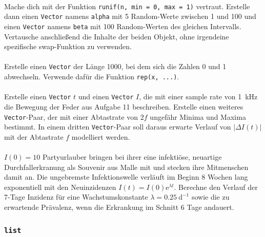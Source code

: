 \documentclass[paper=A4, pagesize, DIV=calc, smallheadings,
fontsize=12pt, expansion=false]{scrreprt}
\begin{document}
\paragraph{}
Mache dich mit der Funktion \texttt{runif(n, min = 0, max = 1)} vertraut. Erstelle dann einen \texttt{Vector} 
namens \texttt{alpha} mit 5 
Random-Werte zwischen 1 und 100 und einen \texttt{Vector} namens \texttt{beta} mit 100 Random-Werten des gleichen 
Intervalls.
Vertausche anschließend die Inhalte der beiden Objekt, ohne irgendeine spezifische swap-Funktion zu verwenden.


\paragraph{}
Erstelle einen \texttt{Vector} der Länge 1000, bei dem sich die Zahlen 0 und 1 abwechseln. Verwende dafür die Funktion 
\texttt{rep(x, ...)}.

\paragraph{}
Erstelle einen \texttt{Vector} $t$ und einen \texttt{Vector} $I$, die mit einer sample rate von \SI{1}{kHz} die 
Bewegung der Feder aus Aufgabe 11 %
beschreiben.
Erstelle einen weiteres \texttt{Vector}-Paar, der mit einer Abtastrate von $2f$ ungefähr Minima und Maxima bestimmt.
In einem dritten \texttt{Vector}-Paar soll daraus erwarte Verlauf von $|\Delta I(t)|$ mit der Abtastrate $f$ modelliert 
werden.

\paragraph{}
$I(0) = 10$ Partyurlauber bringen bei ihrer eine infektiöse, neuartige Durchfallerkranung als Souvenir aus Malle mit 
und stecken ihre Mitmenschen damit an.
Die ungebremste Infektionswelle verläuft im Beginn 8 Wochen lang exponentiell mit den Neuinzidenzen $I(t) = I(0) 
\text{e}^{\lambda t}$.
Berechne den Verlauf der 7-Tage Inzidenz für eine Wachstumskonstante $\lambda = \SI{0.25}{\text{d}^{-1}}$ sowie die zu 
erwartende Prävalenz, wenn die Erkrankung im Schnitt 6 Tage andauert.

\subsubsection*{\texttt{\textbf{list}}}
\end{document}

